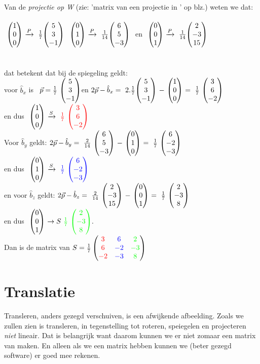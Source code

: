  \\ 

Van de \textit{projectie op W}  (zie:  'matrix van een projectie in \RD' op blz.\pageref{projectieR3}) weten we dat:\\ \\
$ \ \vecdrie{1}{0}{0}   \  \xrightarrow{P}  \  \frac{1}{7}\vecdrie {5 } {3}{-1} $
\quad   $ \ \vecdrie{0}{1}{0}   \  \xrightarrow{P}  \ \frac{1}{14}  \vecdrie{ 6 }{5 }{-3 }\ $ 
en \quad  
$  \ \vecdrie{0}{0}{1}   \  \xrightarrow{P}  \  \frac{1}{14}  \vecdrie{2 }{-3 }{15}\ $\\ \\ \\
dat betekent dat bij de spiegeling geldt:\\
voor $ \hat{b}_x $ is \  
$\vec{p} =  \frac{1}{7} \ \vecdrie {5 } {3}{-1} $\quad  en \quad 
$ 2\vec{p}  -  \hat{b}_x  = 
\ 2 . \frac{1}{7} \vecdrie {5 } {3}{-1} \  - \  \vecdrie{1}{0}{0}  \ =
\   \frac{1}{7} \ \vecdrie {3 } {6}{-2} $ \\en dus 
$ \ \vecdrie{1}{0}{0}   \  \xrightarrow{S}  \  { \color{red}\frac{1}{7}} \  \vecdrie[red] {3 } {6}{-2} $\\
Voor $ \hat{b}_y  $ geldt:
$ 2\vec{p}  -  \hat{b}_y  =  
\ \frac{2}{14} \ \vecdrie {6 } {5}{-3} \  - \  \vecdrie{0}{1}{0}  \ = 
\   \frac{1}{7} \ \vecdrie {6 } {-2}{-3} $  \\ en dus  \quad 
$ \ \vecdrie{0}{1}{0}   \  \xrightarrow{S}  \  { \color{blue}\frac{1}{7}} \  \vecdrie[blue] {6 } {-2}{-3} $\\
en voor $ \hat{b}_z  $ geldt:
$ 2\vec{p}  -  \hat{b}_z  =  
\ \frac{2}{14} \ \vecdrie {2 } {-3}{15} \  - \  \vecdrie{0}{0}{1}  \ = 
\   \frac{1}{7} \ \vecdrie {2 } {-3}{8} $   \\ en dus 
$ \ \vecdrie{0}{0}{1}   \  \rightarrow{S}  \  { \color{green}\frac{1}{7}} \  \vecdrie[green] {2} {-3}{8}. $\\
Dan is de matrix van 
$ S = 
\frac{1}{7} \begin{pmatrix}   {\color{red}3} &  {\color{blue}6} &   {\color{green}2}  \\    {\color{red}6}   &   {\color{blue}-2} &  {\color{green}-3}  \\   {\color{red}-2} &   {\color{blue}-3}  &   {\color{green}8} \end{pmatrix} $

\section{Translatie}		
Transleren, anders gezegd verschuiven, is een afwijkende afbeelding. Zoals we zullen zien is transleren, in tegenstelling tot roteren, speiegelen en projecteren \textit{niet} lineair. Dat is belangrijk want daarom kunnen we er niet zomaar een matrix van maken. En alleen als we een matrix hebben kunnen we (beter gezegd software) er  goed mee rekenen. 
